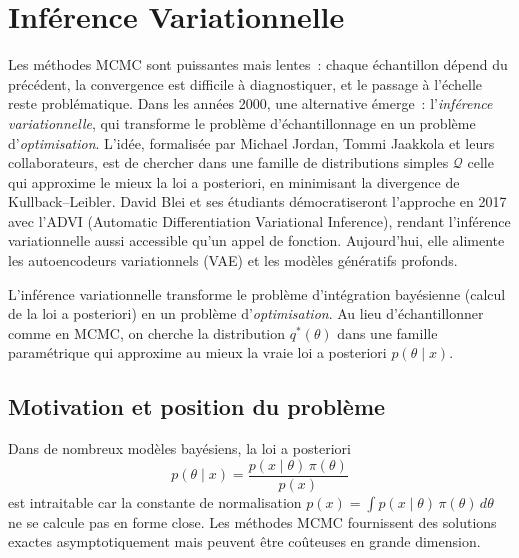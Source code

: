 \chapter{Inf\'erence Variationnelle}
\label{ch:variationnelle}

Les m\'ethodes MCMC sont puissantes mais lentes~: chaque \'echantillon d\'epend du pr\'ec\'edent, la convergence est difficile \`a diagnostiquer, et le passage \`a l'\'echelle reste probl\'ematique. Dans les ann\'ees 2000, une alternative \'emerge~: l'\emph{inf\'erence variationnelle}, qui transforme le probl\`eme d'\'echantillonnage en un probl\`eme d'\emph{optimisation}. L'id\'ee, formalis\'ee par Michael Jordan, Tommi Jaakkola et leurs collaborateurs, est de chercher dans une famille de distributions simples $\mathcal{Q}$ celle qui approxime le mieux la loi a posteriori, en minimisant la divergence de Kullback--Leibler. David Blei et ses \'etudiants d\'emocratiseront l'approche en 2017 avec l'ADVI (Automatic Differentiation Variational Inference), rendant l'inf\'erence variationnelle aussi accessible qu'un appel de fonction. Aujourd'hui, elle alimente les autoencodeurs variationnels (VAE) et les mod\`eles g\'en\'eratifs profonds.

\begin{intuition}[title=\textbf{Id\'ee centrale}]
L'inf\'erence variationnelle transforme le probl\`eme d'int\'egration
bay\'esienne (calcul de la loi a posteriori) en un probl\`eme
d'\emph{optimisation}. Au lieu d'\'echantillonner comme en MCMC, on
cherche la distribution $q^*(\theta)$ dans une famille param\'etrique
qui approxime au mieux la vraie loi a posteriori $p(\theta \mid x)$.
\end{intuition}

\section{Motivation et position du probl\`eme}

Dans de nombreux mod\`eles bay\'esiens, la loi a posteriori
\[
  p(\theta \mid x) = \frac{p(x \mid \theta)\,\pi(\theta)}{p(x)}
\]
est intraitable car la constante de normalisation
$p(x) = \int p(x \mid \theta)\,\pi(\theta)\,d\theta$ ne se calcule pas
en forme close. Les m\'ethodes MCMC fournissent des solutions exactes
asymptotiquement mais peuvent \^etre co\^uteuses en grande dimension.

